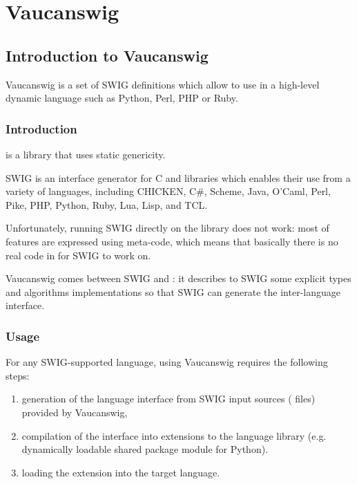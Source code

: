 \chapter{Vaucanswig}
\label{sec:swig}

\section{Introduction to Vaucanswig}

Vaucanswig is a set of SWIG definitions which allow to use \Vauc in a
high-level dynamic language such as Python, Perl, PHP or Ruby.

\subsection{Introduction}

\Vauc is a \Cxx library that uses static genericity.

SWIG is an interface generator for C and \Cxx libraries which enables
their use from a variety of languages, including CHICKEN, C\#, Scheme,
Java, O'Caml, Perl, Pike, PHP, Python, Ruby, Lua, Lisp, and TCL.

Unfortunately, running SWIG directly on the \Vauc library does not
work: most of \Vauc features are expressed using \Cxx meta-code,
which means that basically there is no real code in \Vauc for SWIG
to work on.

Vaucanswig comes between SWIG and \Vauc: it describes to SWIG
some explicit \Vauc types and algorithms implementations so that
SWIG can generate the inter-language interface.

\subsection{Usage}

For  any  SWIG-supported   language,  using  Vaucanswig  requires  the
following steps:

\begin{enumerate}
\item generation of the language interface from SWIG input sources
  ( files) provided by Vaucanswig,

\item compilation of the interface into extensions to the language
  library (e.g.  dynamically loadable shared package module for
  Python).

\item loading the extension into the target language.
\end{enumerate}


